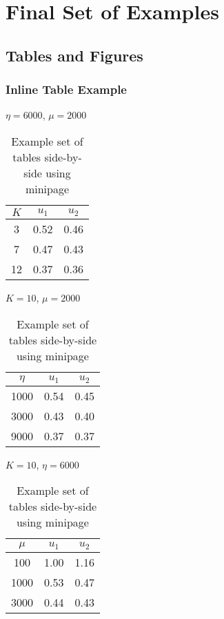 \chapter{Final Set of Examples}
\label{chapter3}

\section{Tables and Figures}

\subsection{Inline Table Example}
\begin{table}[h]
	\caption{Example set of tables side-by-side using minipage} 
	\centering
	\begin{minipage}[b]{0.30\linewidth}
		\centerline{$\eta=6000$, $\mu=2000$}\smallskip
		\centering
		\begin{tabular}{ccc}
			\hline
			$K$ & $u_1$ & $u_2$\\
			\hline
			3   & 0.52 &0.46\\
			7   & 0.47 &0.43\\
			12  & 0.37 &0.36\\
			\hline
		\end{tabular}
	\end{minipage}
	\begin{minipage}[b]{0.34\linewidth}
		\centerline{$K=10$, $\mu=2000$}\smallskip
		\centering
		\begin{tabular}{ccc}
			\hline
			$\eta$ & $u_1$ & $u_2$\\
			\hline
			1000&0.54& 0.45\\
			3000&0.43& 0.40\\
			9000&0.37& 0.37\\
			\hline
		\end{tabular}
	\end{minipage}
	\begin{minipage}[b]{0.32\linewidth}
		\centerline{$K=10$, $\eta=6000$}\smallskip
		\centering
		\begin{tabular}{ccc}
			\hline
			$\mu$ & $u_1$ & $u_2$\\
			\hline
			100 &1.00&1.16\\
			1000&0.53&0.47\\
			3000&0.44&0.43\\
			\hline
		\end{tabular}
	\end{minipage}
	\label{tab:threetabs}
\end{table}